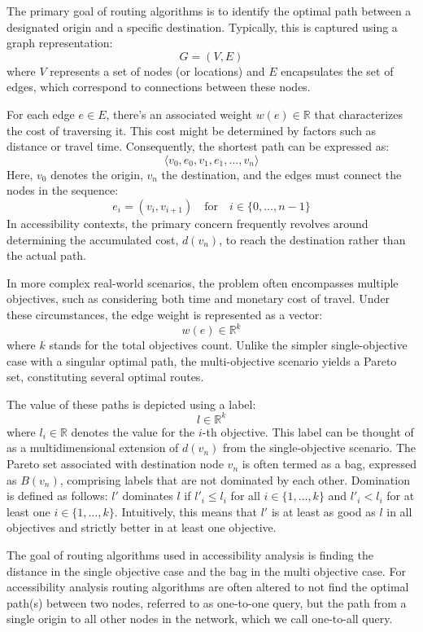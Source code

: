 The primary goal of routing algorithms is to identify the optimal path between a designated origin and a specific destination.
Typically, this is captured using a graph representation:
\[ G = (V, E) \]
where $V$ represents a set of nodes (or locations) and $E$ encapsulates the set of edges, which correspond to connections between these nodes.

For each edge \( e \in E \), there's an associated weight \( w(e) \in \mathbb{R} \) that characterizes the cost of traversing it.
This cost might be determined by factors such as distance or travel time.
Consequently, the shortest path can be expressed as:
\[ \langle v_0, e_0, v_1, e_1, \dots, v_n \rangle \]
Here, \( v_0 \) denotes the origin, \( v_n \) the destination, and the edges must connect the nodes in the sequence:
\[ e_i = (v_i, v_{i+1}) \quad \text{for} \quad i \in \{0, \dots, n-1\} \]
In accessibility contexts, the primary concern frequently revolves around determining the accumulated cost, \( d(v_n) \), to reach the destination rather than the actual path.

In more complex real-world scenarios, the problem often encompasses multiple objectives, such as considering both time and monetary cost of travel.
Under these circumstances, the edge weight is represented as a vector:
\[ w(e) \in \mathbb{R}^k \]
where \( k \) stands for the total objectives count.
Unlike the simpler single-objective case with a singular optimal path, the multi-objective scenario yields a Pareto set, constituting several optimal routes.

The value of these paths is depicted using a label:
\[ l \in \mathbb{R}^k \]
where \( l_i \in \mathbb{R} \) denotes the value for the \( i \)-th objective.
This label can be thought of as a multidimensional extension of \( d(v_n) \) from the single-objective scenario.
The Pareto set associated with destination node \( v_n \) is often termed as a bag, expressed as \( B(v_n) \), comprising labels that are not dominated by each other.
Domination is defined as follows: \( l' \) dominates \( l \) if \( l'_i \leq l_i \) for all \( i \in \{1, \dots, k\} \) and \( l'_i < l_i \) for at least one \( i \in \{1, \dots, k\} \).
Intuitively, this means that \( l' \) is at least as good as \( l \) in all objectives and strictly better in at least one objective.

The goal of routing algorithms used in accessibility analysis is finding the distance in the single objective case and the bag in the multi objective case.
For accessibility analysis routing algorithms are often altered to not find the optimal path(s) between two nodes, referred to as one-to-one query, but the path from a single origin to all other nodes in the network, which we call one-to-all query.

